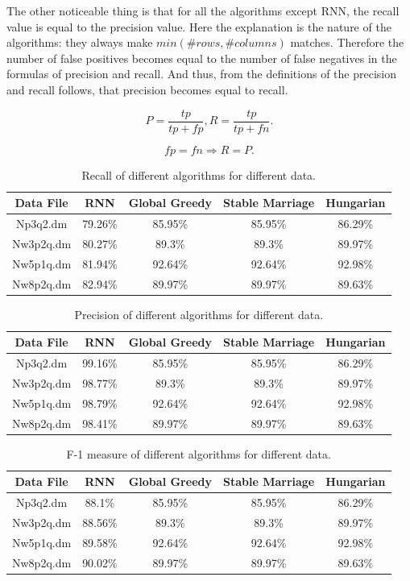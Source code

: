 \documentclass[a4paper,11pt]{article}
\begin{document}
The other noticeable thing is that for all the algorithms except RNN, the recall value is equal to the precision value. Here the explanation is the nature of the algorithms: they always make $min(\#rows, \#columns)$ matches. Therefore the number of false positives becomes equal to the number of false negatives in the formulas of precision and recall. And thus, from the definitions of the precision and recall follows, that precision becomes equal to recall.


\[P = \frac{tp}{tp+fp}, R = \frac{tp}{tp+fn}.\]

\[fp=fn \Rightarrow R=P.\]

\begin{table}[tbh]
\centering
\begin{tabular}{|c|c|c|c|c|}
\hline 
Data File & RNN & Global Greedy & Stable Marriage & Hungarian \tabularnewline
\hline 
\hline 
 Np3q2.dm & 79.26\% & 85.95\% & 85.95\% & 86.29\%\tabularnewline
\hline
 Nw3p2q.dm & 80.27\% & 89.3\% & 89.3\% & 89.97\%\tabularnewline
\hline 
 Nw5p1q.dm & 81.94\% & 92.64\% & 92.64\% & 92.98\%\tabularnewline
\hline 
 Nw8p2q.dm & 82.94\% & 89.97\% & 89.97\% & 89.63\%\tabularnewline
\hline
\end{tabular}
\caption{Recall of different algorithms for different data.}
\label{recall}
\end{table}

\begin{table}[tbh]
\centering
\begin{tabular}{|c|c|c|c|c|}
\hline 
Data File & RNN & Global Greedy & Stable Marriage & Hungarian \tabularnewline
\hline 
\hline 
 Np3q2.dm & 99.16\% & 85.95\% & 85.95\% & 86.29\%\tabularnewline
\hline
 Nw3p2q.dm & 98.77\% & 89.3\% & 89.3\% & 89.97\%\tabularnewline
\hline 
 Nw5p1q.dm & 98.79\% & 92.64\% & 92.64\% & 92.98\%\tabularnewline
\hline 
 Nw8p2q.dm & 98.41\% & 89.97\% & 89.97\% & 89.63\%\tabularnewline
\hline
\end{tabular}
\caption{Precision of different algorithms for different data.}
\label{precision}
\end{table}

\begin{table}[tbh]
\centering
\begin{tabular}{|c|c|c|c|c|}
\hline 
Data File & RNN & Global Greedy & Stable Marriage & Hungarian \tabularnewline
\hline 
\hline 
 Np3q2.dm & 88.1\% & 85.95\% & 85.95\% & 86.29\%\tabularnewline
\hline
 Nw3p2q.dm & 88.56\% & 89.3\% & 89.3\% & 89.97\%\tabularnewline
\hline 
 Nw5p1q.dm & 89.58\% & 92.64\% & 92.64\% & 92.98\%\tabularnewline
\hline 
 Nw8p2q.dm & 90.02\% & 89.97\% & 89.97\% & 89.63\%\tabularnewline
\hline
\end{tabular}
\caption{F-1 measure of different algorithms for different data.}
\label{fmeasure}
\end{table}
\end{document}
